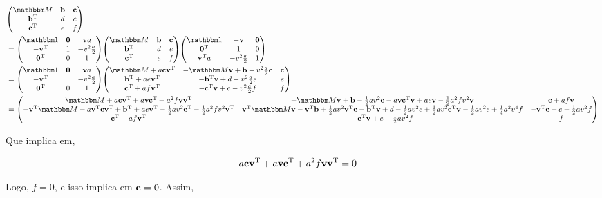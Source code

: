 \documentclass[twoside]{amsart}
\numberwithin{equation}{section}
\begin{document}
\begin{align}
    &\mqty(\mathbbm M&\vb b&\vb c\\\vb b^{\textup T}&d&e\\\vb c^{\textup T}&e&f)\\
    &=\mqty(\mathbbm 1&\vb 0&\vb v a\\ -\vb v^{\textup T }&1&-v^2\frac a2\\\vb 0^{\textup T}&0&1)\mqty(\mathbbm M&\vb b&\vb c\\\vb b^{\textup T}&d&e\\\vb c^{\textup T}&e&f)\mqty(\mathbbm 1&-\vb v&\vb 0\\ \vb 0^{\textup T }&1&0\\\vb v^{\textup T}a&-v^2\frac a2&1)\\
    &=\mqty(\mathbbm 1&\vb 0&\vb v a\\ -\vb v^{\textup T }&1&-v^2\frac a2\\\vb 0^{\textup T}&0&1)\mqty(\mathbbm M+a\vb c\vb v^{\textup T}&-\mathbbm M\vb v+\vb b-v^2\frac a2\vb c&\vb c\\ \vb b^{\textup T}+ae\vb v^{\textup T}&-\vb b^{\textup T}\vb v+d-v^2\frac a2 e&e\\\vb c^{\textup T}+af\vb v^{\textup T}&-\vb c^{\textup T}\vb v+e-v^2\frac a2 f&f)\\
    &=\mqty(\mathbbm M+a\vb c\vb v^{\textup T}+a\vb v\vb c^{\textup T}+a^2f\vb v\vb v^{\textup T}&-\mathbbm M \vb v+\vb b-\frac12 av^2\vb c-a\vb v\vb c^{\textup T}\vb v+ae\vb v-\frac12 a^2fv^2\vb v&\vb c+af\vb v\\ -\vb v^{\textup T}\mathbbm M-a\vb v^{\textup T}\vb c\vb v^{\textup T}+\vb b^{\textup T}+ae\vb v^{\textup T}-\frac12 av^2\vb c^{\textup T}-\frac12 a^2fv^2\vb v^{\textup T}&\vb v^{\textup T}\mathbbm M\vb v-\vb v^{\textup T}\vb b+\frac12 av^2\vb v^{\textup T}\vb c-\vb b^{\textup T}\vb v+d-\frac12av^2e+\frac12av^2\vb c^{\textup T}\vb v-\frac12 av^2e+\frac14 a^2v^4f&-\vb v^{\textup T}\vb c+e-\frac12 av^2f\\ \vb c^{\textup T}+af\vb v^{\textup T}&-\vb c^{\textup T}\vb v+e-\frac12 av^2f&f)
\end{align}

Que implica em,

\begin{align}
    a\vb c\vb v^{\textup T}+a\vb v\vb c^{\textup T}+a^2f\vb v\vb v^{\textup T}&=0
\end{align}

Logo, $f=0$, e isso implica em $\vb c=0$. Assim,
\end{document}
